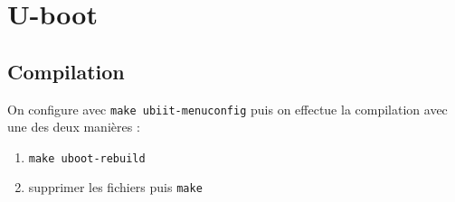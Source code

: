 \documentclass[resume]{subfiles}
\begin{document}
\section{U-boot}
\subsection{Compilation}
On configure avec \verb!make ubiit-menuconfig! puis on effectue la compilation avec une des deux manières :
\begin{enumerate}
\item \verb!make uboot-rebuild!
\item supprimer les fichiers puis \verb!make!
\end{enumerate}
\end{document}
